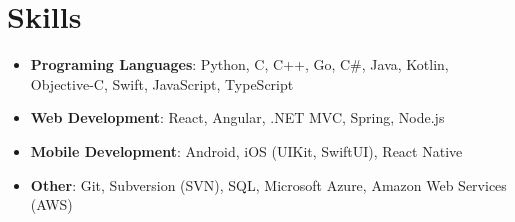 \documentclass{article}
\begin{document}
\section*{Skills}
\begin{itemize}
\item \textbf{Programing Languages}: Python, C, C++, Go, C\#, Java, Kotlin, Objective-C, Swift, JavaScript, TypeScript
\item \textbf{Web Development}: React, Angular, .NET MVC, Spring, Node.js
\item \textbf{Mobile Development}: Android, iOS (UIKit, SwiftUI), React Native
\item \textbf{Other}: Git, Subversion (SVN), SQL, Microsoft Azure, Amazon Web Services (AWS)
\end{itemize}
\end{document}
